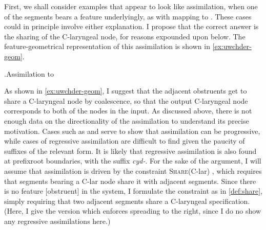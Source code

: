 First, we shall consider  examples that appear to look like assimilation, \ie when one of the segments bears a  feature underlyingly, as with  mapping to \ipa{[iuχter]}. These cases could in principle involve either explanation. I propose that the correct answer is the sharing of the C-laryngeal node, for reasons expounded upon below. The feature-geometrical representation of this assimilation is shown in \ref{ex:uwchder-geom}.

\ex.\label{ex:uwchder-geom}Assimilation to \\

As shown in \ref{ex:uwchder-geom}, I suggest that the adjacent obstruents get to share a C-laryngeal node by coalescence, so that the output C-laryngeal node corresponds to both of the nodes in the input. As discussed above, there is not enough data on the directionality of the assimilation to understand its precise motivation. Cases such as \ipa{[iuχter]} and \ipa{[ɬeiθter]} serve to show that assimilation can be progressive, while cases of regressive assimilation are difficult to find given the paucity of suffixes of the relevant form. It is likely that regressive assimilation is also found at prefix\endash root boundaries, \eg with the suffix \emph{cyd-}. For the sake of the argument, I will assume that assimilation is driven by the constraint \textsc{Share}(C-lar) \citep[\egm][]{honeybone06:_disag,mccarthy09:_harmon_harmon_serial}, which requires that segments bearing a C-lar node share it with adjacent segments. Since there is no feature [obstruent] in the system, I formulate the constraint as in \cref{def:share}, simply requiring that two adjacent segments share a C-laryngeal specification. (Here, I give the version which enforces spreading to the right, since I do no show any regressive assimilations here.)

